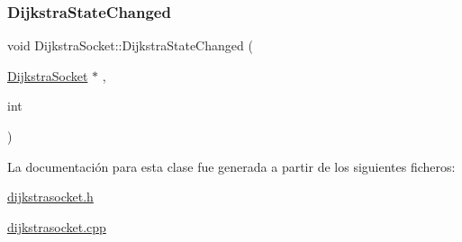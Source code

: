 \mbox{\label{class_dijkstra_socket_a4527ae22be46f923b0c13eabf170e96f}} 
\subsubsection{\texorpdfstring{Dijkstra\+State\+Changed}{DijkstraStateChanged}}
{\footnotesize\ttfamily void Dijkstra\+Socket\+::\+Dijkstra\+State\+Changed (\begin{DoxyParamCaption}\item[{\hyperlink{class_dijkstra_socket}{Dijkstra\+Socket} $\ast$}]{,  }\item[{int}]{ }\end{DoxyParamCaption})\hspace{0.3cm}{\ttfamily [signal]}}



La documentación para esta clase fue generada a partir de los siguientes ficheros\+:\begin{DoxyCompactItemize}
\item 
\hyperlink{dijkstrasocket_8h}{dijkstrasocket.\+h}\item 
\hyperlink{dijkstrasocket_8cpp}{dijkstrasocket.\+cpp}\end{DoxyCompactItemize}
